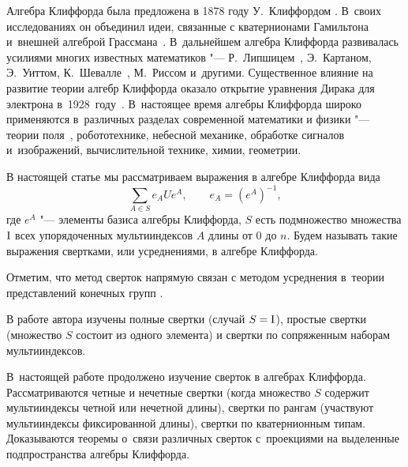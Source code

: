 
\date{15/XII/2014} %




\makerutitle

Алгебра Клиффорда была предложена в 1878 году У.~Клиффордом \cite{shir:Clifford}. 
В~своих исследованиях он объединил идеи, связанные с кватернионами Гамильтона~\cite{shir:Hamilton} и~внешней алгеброй Грассмана~\cite{shir:Grassmann}. 
В~дальнейшем алгебра Клиффорда развивалась усилиями многих известных математиков "--- Р.~Липшицем~\cite{shir:Lipsch}, Э.~Картаном, Э.~Уиттом, К.~Шевалле~\cite{shir:Chevall}, М.~Риссом и~другими. 
Существенное влияние на развитие теории алгебр Клиффорда оказало открытие уравнения Дирака для электрона в~1928~году~\cite{shir:Dirac}. 
В~настоящее время алгебры Клиффорда широко применяются в~различных разделах современной математики и физики "--- теории поля~\cite{shir:Hestenes, shir:Marchuk}, робототехнике, небесной механике, обработке сигналов и~изображений, вычислительной технике, химии, геометрии.

В настоящей статье мы рассматриваем выражения в алгебре Клиффорда вида
$$
\sum_{A\in S}e_A U e^A,\qquad e_A=(e^A)^{-1},
$$
где $e^A$ "--- элементы базиса алгебры Клиффорда, $S$ есть подмножество множества $\rm I$ всех упорядоченных мультииндексов $A$ длины от $0$ до $n$. 
Будем называть такие выражения свертками, или усреднениями, в алгебре Клиффорда.

Отметим, что метод сверток напрямую связан с методом усреднения в~теории представлений конечных групп \cite{shir:tr1, shir:tr2}.

В работе автора \cite{shir:aacacontr} изучены полные свертки (случай $S=\rm I$), простые свертки (множество $S$ состоит из одного элемента) и свертки по сопряженным наборам мультииндексов.

В~настоящей работе продолжено изучение сверток в алгебрах Клиффорда. 
Рассматриваются четные и нечетные свертки (когда множество $S$ содержит мультииндексы четной или нечетной длины), свертки по рангам (участвуют мультииндексы фиксированной длины), свертки по кватернионным типам. 
Доказываются теоремы о~связи различных сверток с~проекциями на выделенные подпространства алгебры Клиффорда.

